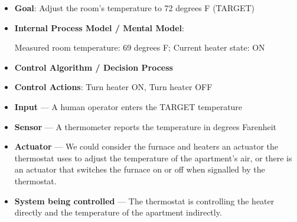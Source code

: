 \begin{itemize}
\setlength{\itemsep}{0pt}
\setlength{\parskip}{.25em}
\item \textbf{Goal}: Adjust the room's temperature to 72 degrees F (TARGET)
\item \textbf{Internal Process Model / Mental Model}: 

Measured room temperature: 69 degrees F; Current heater state: ON
\item \textbf{Control Algorithm / Decision Process}
\item \textbf{Control Actions}: Turn heater ON, Turn heater OFF 
\item \textbf{Input} --- A human operator enters the TARGET temperature
\item \textbf{Sensor} --- A thermometer reports the temperature in degrees Farenheit
\item \textbf{Actuator} --- We could consider the furnace and heaters an actuator the thermostat uses to adjust the temperature of the apartment's air, or there is an actuator that switches the furnace on or off when signalled by the thermostat.
\item \textbf{System being controlled} --- The thermostat is controlling the heater directly and the temperature of the apartment indirectly.
\end{itemize}  







